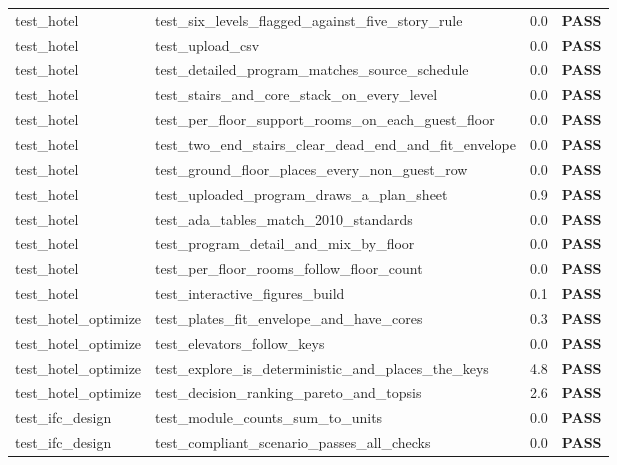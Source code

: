 \documentclass[10pt]{article}
\begin{document}
{\begin{longtable}{p{2.6cm}p{9.6cm}p{1.0cm}p{1.4cm}}
test\_hotel & test\_six\_levels\_flagged\_against\_five\_story\_rule & 0.0 & \textcolor{pass}{\textbf{PASS}} \\
test\_hotel & test\_upload\_csv & 0.0 & \textcolor{pass}{\textbf{PASS}} \\
test\_hotel & test\_detailed\_program\_matches\_source\_schedule & 0.0 & \textcolor{pass}{\textbf{PASS}} \\
test\_hotel & test\_stairs\_and\_core\_stack\_on\_every\_level & 0.0 & \textcolor{pass}{\textbf{PASS}} \\
test\_hotel & test\_per\_floor\_support\_rooms\_on\_each\_guest\_floor & 0.0 & \textcolor{pass}{\textbf{PASS}} \\
test\_hotel & test\_two\_end\_stairs\_clear\_dead\_end\_and\_fit\_envelope & 0.0 & \textcolor{pass}{\textbf{PASS}} \\
test\_hotel & test\_ground\_floor\_places\_every\_non\_guest\_row & 0.0 & \textcolor{pass}{\textbf{PASS}} \\
test\_hotel & test\_uploaded\_program\_draws\_a\_plan\_sheet & 0.9 & \textcolor{pass}{\textbf{PASS}} \\
test\_hotel & test\_ada\_tables\_match\_2010\_standards & 0.0 & \textcolor{pass}{\textbf{PASS}} \\
test\_hotel & test\_program\_detail\_and\_mix\_by\_floor & 0.0 & \textcolor{pass}{\textbf{PASS}} \\
test\_hotel & test\_per\_floor\_rooms\_follow\_floor\_count & 0.0 & \textcolor{pass}{\textbf{PASS}} \\
test\_hotel & test\_interactive\_figures\_build & 0.1 & \textcolor{pass}{\textbf{PASS}} \\
test\_hotel\_optimize & test\_plates\_fit\_envelope\_and\_have\_cores & 0.3 & \textcolor{pass}{\textbf{PASS}} \\
test\_hotel\_optimize & test\_elevators\_follow\_keys & 0.0 & \textcolor{pass}{\textbf{PASS}} \\
test\_hotel\_optimize & test\_explore\_is\_deterministic\_and\_places\_the\_keys & 4.8 & \textcolor{pass}{\textbf{PASS}} \\
test\_hotel\_optimize & test\_decision\_ranking\_pareto\_and\_topsis & 2.6 & \textcolor{pass}{\textbf{PASS}} \\
test\_ifc\_design & test\_module\_counts\_sum\_to\_units & 0.0 & \textcolor{pass}{\textbf{PASS}} \\
test\_ifc\_design & test\_compliant\_scenario\_passes\_all\_checks & 0.0 & \textcolor{pass}{\textbf{PASS}} \\

\end{longtable}}
\end{document}

